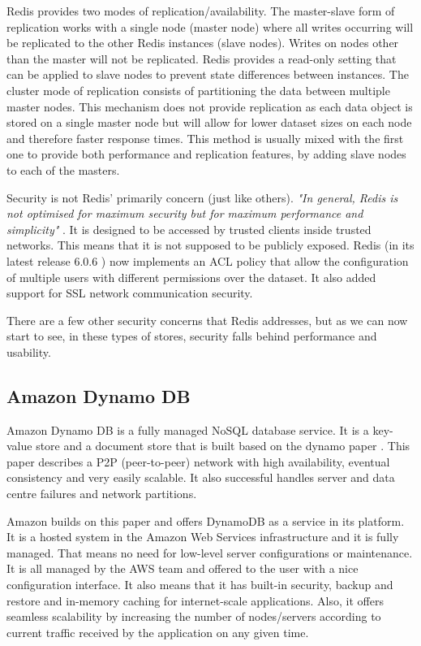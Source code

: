 Redis provides two modes of replication/availability. The master-slave form of replication works with a single node (master node) where all writes occurring will be replicated to the other Redis instances (slave nodes). Writes on nodes other than the master will not be replicated. Redis provides a read-only setting that can be applied to slave nodes to prevent state differences between instances. The cluster mode of replication consists of partitioning the data between multiple master nodes. This mechanism does not provide replication as each data object is stored on a single master node but will allow for lower dataset sizes on each node and therefore faster response times. This method is usually mixed with the first one to provide both performance and replication features, by adding slave nodes to each of the masters.

Security is not Redis' primarily concern (just like others). \textit{"In general, Redis is not optimised for maximum security but for maximum performance and simplicity"} \cite{redis:4}. It is designed to be accessed by trusted clients inside trusted networks. This means that it is not supposed to be publicly exposed. Redis (in its latest release 6.0.6 \cite{redis:5}) now implements an \gls{ACL} policy that allow the configuration of multiple users with different permissions over the dataset. It also added support for \gls{SSL} network communication security.

There are a few other security concerns that Redis addresses, but as we can now start to see, in these types of stores, security falls behind performance and usability.

\subsection{Amazon Dynamo DB}
\label{ssec:amazon_dynamo_db}

Amazon Dynamo DB \cite{dynamo:1} is a fully managed NoSQL database service. It is a key-value store and a document store that is built based on the dynamo paper \cite{dynamo:2}. This paper describes a \gls{P2P} (peer-to-peer) network with high availability, eventual consistency and very easily scalable. It also successful handles server and data centre failures and network partitions.

Amazon builds on this paper and offers DynamoDB as a service in its platform. It is a hosted system in the Amazon Web Services \cite{aws:1} infrastructure and it is fully managed. That means no need for low-level server configurations or maintenance. It is all managed by the \gls{AWS} team and offered to the user with a nice configuration interface. It also means that it has built-in security, backup and restore and in-memory caching for internet-scale applications. Also, it offers seamless scalability by increasing the number of nodes/servers according to current traffic received by the application on any given time. 

